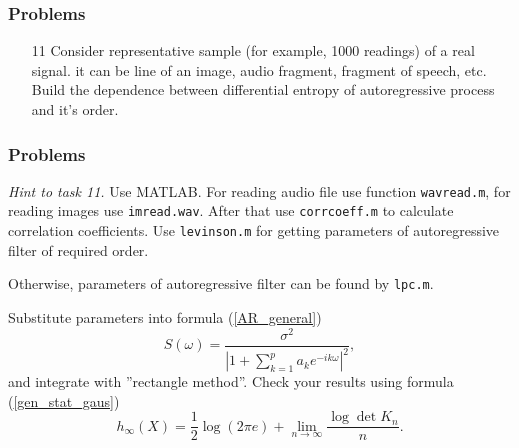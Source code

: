 \documentclass[14pt]{beamer}
\begin{document}
\begin{frame}
\frametitle{Problems}
\begin{enumerate}

\item[11] Consider representative sample (for example, 1000 readings) of a real signal.
it can be line of an image, audio fragment, fragment of speech, etc.
Build the dependence between differential entropy of autoregressive process and it's order.

\end{enumerate}
\end{frame}


\begin{frame}
\frametitle{Problems}
\begin{enumerate}
\small{ 

    \emph{Hint to task 11.} Use MATLAB.
    For reading audio file use function \texttt{wavread.m}, for reading images use \texttt{imread.wav}. 
    After that use \texttt{corrcoeff.m} to calculate correlation coefficients.
    Use \texttt{levinson.m} for getting parameters of autoregressive filter of required order. 
    
    Otherwise, parameters of autoregressive filter can be found by \texttt{lpc.m}. 
    
    Substitute parameters into formula (\ref{AR_general})
    \begin{equation}\label{AR_general}
    S(\omega)=\frac{\sigma^2}{\left|1+\sum_{k=1}^{p}a_k%
    e^{-ik\omega} \right|^2},
    \end{equation}
    and integrate with ''rectangle method''.
    Check your results using formula (\ref{gen_stat_gaus})
    \begin{equation}
    \label{gen_stat_gaus}
    h_{\infty}(X)=\frac{1}{2}\log(2\pi e)+%
    \lim_{n \to \infty}\frac{\log\det K_n}{n}.
    \end{equation}

}
\end{enumerate}
\end{frame}
\end{document}
